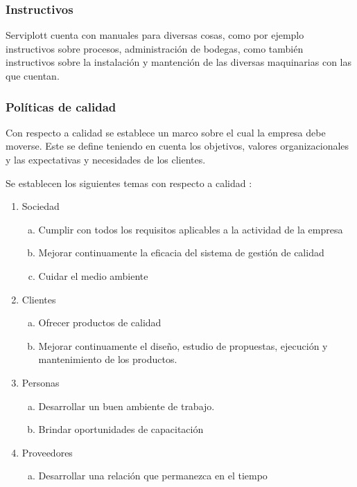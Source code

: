 		\subsubsection{Instructivos}
		
		Serviplott cuenta con manuales para diversas cosas, como por ejemplo instructivos sobre procesos, administración de bodegas, como también instructivos sobre la instalación y mantención de las diversas maquinarias con las que cuentan. 		 		\subsubsection{Políticas de calidad}
		
		Con respecto a calidad se establece un marco sobre el cual la empresa debe moverse. Este se define teniendo en cuenta los objetivos, valores organizacionales y las expectativas y necesidades de los clientes.
		
		
		Se establecen los siguientes temas con respecto a calidad :
		
		\begin{enumerate}[1)]
		\item Sociedad
		  \begin{enumerate}[a)]
		  \item Cumplir con todos los requisitos aplicables a la actividad de la empresa
		  \item  Mejorar continuamente la eficacia del sistema de gestión de calidad
		  \item  Cuidar el medio ambiente
		  \end{enumerate}
		\item Clientes
		  \begin{enumerate}[a)]
		  \item Ofrecer productos de calidad
		  \item Mejorar continuamente el diseño, estudio de propuestas, ejecución y mantenimiento de los productos.
		  \end{enumerate}
		\item Personas
		  \begin{enumerate}[a)]
		  \item Desarrollar un buen ambiente de trabajo.
		  \item Brindar oportunidades de capacitación
		  \end{enumerate}
		\item Proveedores
		  \begin{enumerate}[a)]
		  \item Desarrollar una relación que permanezca en el tiempo
		  \end{enumerate}
		\end{enumerate}
		  
